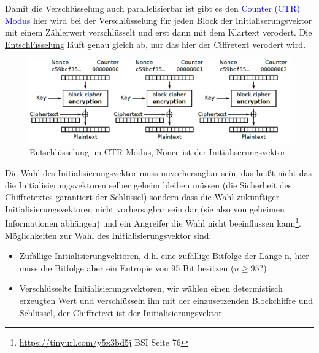 \documentclass[a4paper,12pt,leqno]{article}
\newcommand{\blue}[1]{\textcolor{blue}{#1}}
\begin{document}
Damit die Verschlüsselung auch parallelisierbar ist gibt es den \blue{Counter (CTR) Modus} hier wird bei der Verschlüsselung für jeden Block der Initialiserungsvektor mit einem Zählerwert verschlüsselt und erst dann mit dem Klartext verodert. Die \hyperref[pic:CTRModus]{Entschlüsselung} läuft genau gleich ab, nur das hier der Ciffretext verodert wird.\\
\begin{figure}
\centering
\includegraphics[scale=0.5]{Grafiken/CounterCTRModus.png}
\caption{Entschlüsselung im CTR Modus, Nonce ist der Initialiserungsvektor}
\label{pic:CTRModus}
\end{figure}
Die Wahl des Initialisierungsvektor muss unvorhersagbar sein, das heißt nicht das die Initialisierungsvektoren selber geheim bleiben müssen (die Sicherheit des Chiffretextes garantiert der Schlüssel) sondern dass die Wahl zukünftiger Initialisierungsvektoren nicht vorhersagbar sein dar (sie also von geheimen Informationen abhängen) und ein Angreifer die Wahl nicht beeinflussen kann\footnote{\url{https://tinyurl.com/y5x3bd5j} BSI Seite 76}.\\
Möglichkeiten zur Wahl des Initialisierungsvektor sind:
\begin{itemize}
\item Zufällige Initialisierungvektoren, d.h. eine zufällige Bitfolge der Länge n, hier muss die Bitfolge aber ein Entropie von 95 Bit besitzen ($n\geq95$?)
\item Verschlüsselte Initialisierungsvektoren, wir wählen einen determistisch erzeugten Wert und verschlüsseln ihn mit der einzusetzenden Blockchiffre und Schlüssel, der Chiffretext ist der Initialisierungsvektor
\end{itemize}
\end{document}
